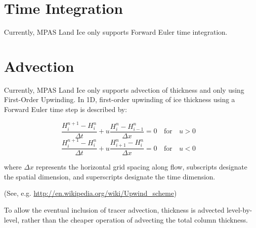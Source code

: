 \section{Time Integration}

Currently, MPAS Land Ice only supports Forward Euler time integration.


\section{Advection}

Currently, MPAS Land Ice only supports advection of thickness and only using First-Order Upwinding. 
In 1D, first-order upwinding of ice thickness using a Forward Euler time step is described by:

\begin{equation}
    \label{fouw}
 \frac{H_i^{n+1} - H_i^n}{\Delta t} + u \frac{H_i^n - H_{i-1}^n}{\Delta x} = 0 \quad \text{for} \quad u > 0
\end{equation}
\begin{equation}
 \frac{H_i^{n+1} - H_i^n}{\Delta t} + u \frac{H_{i+1}^n - H_i^n}{\Delta x} = 0 \quad \text{for} \quad u < 0
\end{equation}

where ${\Delta x}$ represents the horizontal grid spacing along flow, subscripts designate the spatial dimension, and superscripts designate the time dimension.

(See, e.g. \url{http://en.wikipedia.org/wiki/Upwind\_scheme})

To allow the eventual inclusion of tracer advection, thickness is advected level-by-level, rather than the cheaper operation of advecting the total column thickness.


